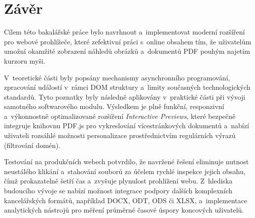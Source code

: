 \documentclass[a4paper,12pt]{article}
\begin{document}
\section*{Závěr}

Cílem této bakalářské práce bylo navrhnout a~implementovat moderní rozšíření pro webové prohlížeče, které zefektivní práci s~online obsahem tím, že uživatelům umožní okamžité zobrazení náhledů obrázků a~dokumentů PDF pouhým najetím kurzoru myši.

V~teoretické části byly popsány mechanismy asynchronního programování, zpracování událostí v~rámci DOM struktury a~limity současných technologických standardů. Tyto poznatky byly následně aplikovány v~praktické části při vývoji samotného softwarového modulu. Výsledkem je plně funkční, responzivní a~výkonnostně optimalizované rozšíření \textit{Interactive Previews}, které bezpečně integruje knihovnu PDF.js pro vykreslování vícestránkových dokumentů a~nabízí uživateli rozsáhlé možnosti personalizace prostřednictvím regulárních výrazů (filtrování domén).

Testování na produkčních webech potvrdilo, že navržené řešení eliminuje nutnost neustálého klikání a~stahování souborů za účelem rychlé inspekce jejich obsahu, čímž prokazatelně šetří čas a~zvyšuje plynulost prohlížení webu. Z~hlediska budoucího vývoje se nabízí možnost integrace podpory dalších komplexních kancelářských formátů, například DOCX, ODT, ODS či XLSX, a~implementace analytických nástrojů pro měření průměrné časové úspory koncových uživatelů.




\ifVSKPusesBibLaTeX					%

\printbibliography

\else								%


%
%
%	
%
\end{document}
